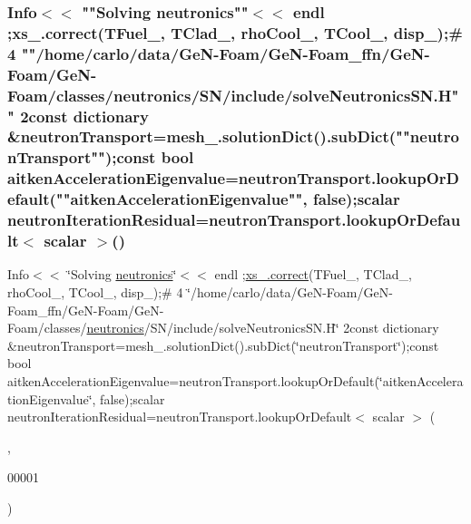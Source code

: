\subsubsection{\texorpdfstring{Info$<$$<$ ""Solving neutronics""$<$$<$ endl ;xs\+\_\+.\+correct(\+T\+Fuel\+\_\+, T\+Clad\+\_\+, rho\+Cool\+\_\+, T\+Cool\+\_\+, disp\+\_\+);\# 4 ""/home/carlo/data/\+Ge\+N-\/\+Foam/\+Ge\+N-\/\+Foam\+\_\+ffn/\+Ge\+N-\/\+Foam/\+Ge\+N-\/\+Foam/classes/neutronics/\+S\+N/include/solve\+Neutronics\+S\+N.\+H"" 2const dictionary \&neutron\+Transport=mesh\+\_\+.\+solution\+Dict().\+sub\+Dict(""neutron\+Transport"");const bool aitken\+Acceleration\+Eigenvalue=neutron\+Transport.\+lookup\+Or\+Default(""aitken\+Acceleration\+Eigenvalue"", false);scalar neutron\+Iteration\+Residual=neutron\+Transport.\+lookup\+Or\+Default$<$ scalar $>$()}{Info<< "Solving neutronics"<< endl ;xs\_.correct(TFuel\_, TClad\_, rhoCool\_, TCool\_, disp\_);# 4 "/home/carlo/data/GeN-Foam/GeN-Foam\_ffn/GeN-Foam/GeN-Foam/classes/neutronics/SN/include/solveNeutronicsSN.H" 2const dictionary \&neutronTransport=mesh\_.solutionDict().subDict("neutronTransport");const bool aitkenAccelerationEigenvalue=neutronTransport.lookupOrDefault("aitkenAccelerationEigenvalue", false);scalar neutronIterationResidual=neutronTransport.lookupOrDefault< scalar >()}}
{\footnotesize\ttfamily Info$<$$<$ \char`\"{}Solving \hyperlink{main_2include_2createFields_8H_aba4910c7964b6a522b7f0b911f652e9d}{neutronics}\char`\"{}$<$$<$ endl ;\hyperlink{hEqn_8H_a3a2458f7f54158be848527a3fdedd5dd}{xs\+\_\+.\+correct}(T\+Fuel\+\_\+, T\+Clad\+\_\+, rho\+Cool\+\_\+, T\+Cool\+\_\+, disp\+\_\+);\# 4 \char`\"{}/home/carlo/data/GeN-\/Foam/GeN-\/Foam\+\_\+ffn/GeN-\/Foam/GeN-\/Foam/classes/\hyperlink{main_2include_2createFields_8H_aba4910c7964b6a522b7f0b911f652e9d}{neutronics}/SN/include/solve\+Neutronics\+S\+N.\+H\char`\"{} 2const dictionary \&neutron\+Transport=mesh\+\_\+.\+solution\+Dict().\+sub\+Dict(\char`\"{}neutron\+Transport\char`\"{});const bool aitken\+Acceleration\+Eigenvalue=neutron\+Transport.\+lookup\+Or\+Default(\char`\"{}aitken\+Acceleration\+Eigenvalue\char`\"{}, false);scalar neutron\+Iteration\+Residual=neutron\+Transport.\+lookup\+Or\+Default$<$ scalar $>$ (\begin{DoxyParamCaption}\item[{\char`\"{}neutron\+Iteration\+Residual\char`\"{}}]{,  }\item[{0.}]{00001 }\end{DoxyParamCaption})}

\mbox{\label{solveNeutronicsSN_8H_a0518c2af37f1cd9c3cc38b22314d3849}} 
